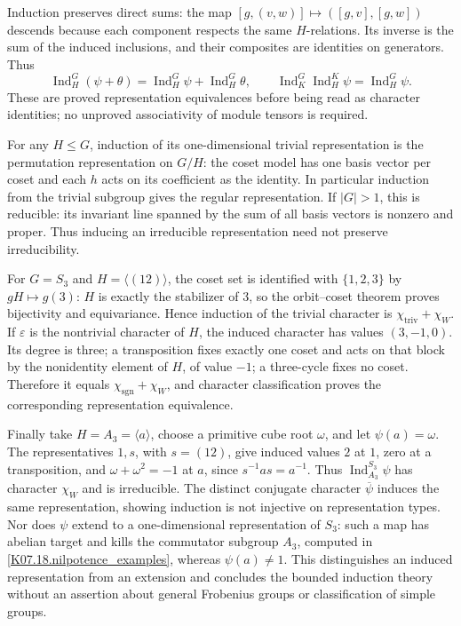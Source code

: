 Induction preserves direct sums: the map
$[g,(v,w)]\mapsto([g,v],[g,w])$ descends because each component
respects the same $H$-relations. Its inverse is the sum of the induced
inclusions, and their composites are identities on generators. Thus
\[
 \operatorname{Ind}_H^G(\psi+\theta)
 =\operatorname{Ind}_H^G\psi+\operatorname{Ind}_H^G\theta,
 \qquad
 \operatorname{Ind}_K^G\operatorname{Ind}_H^K\psi
 =\operatorname{Ind}_H^G\psi.
\]
These are proved representation equivalences before being read as
character identities; no unproved associativity of module tensors is
required.

For any $H\leq G$, induction of its one-dimensional trivial
representation is the permutation representation on $G/H$: the coset
model has one basis vector per coset and each $h$ acts on its coefficient
as the identity. In particular induction from the trivial subgroup gives
the regular representation. If $|G|>1$, this is reducible: its invariant
line spanned by the sum of all basis vectors is nonzero and proper.
Thus inducing an irreducible representation need not preserve
irreducibility.

For $G=S_3$ and $H=\langle(12)\rangle$, the coset set is identified
with $\{1,2,3\}$ by $gH\mapsto g(3)$: $H$ is exactly the
stabilizer of $3$, so the orbit--coset theorem proves bijectivity and
equivariance. Hence induction of the trivial character is
$\chi_{\mathrm{triv}}+\chi_W$. If $\varepsilon$ is the nontrivial
character of $H$, the induced character has values $(3,-1,0)$.
Its degree is three; a transposition fixes exactly one coset and acts
on that block by the nonidentity element of $H$, of value $-1$;
a three-cycle fixes no coset. Therefore it equals
$\chi_{\mathrm{sgn}}+\chi_W$, and character classification proves
the corresponding representation equivalence.

Finally take $H=A_3=\langle a\rangle$, choose a primitive cube root
$\omega$, and let $\psi(a)=\omega$. The representatives $1,s$,
with $s=(12)$, give induced values $2$ at $1$, zero at a
transposition, and $\omega+\omega^2=-1$ at $a$, since
$s^{-1}as=a^{-1}$. Thus $\operatorname{Ind}_{A_3}^{S_3}\psi$
has character $\chi_W$ and is irreducible. The distinct conjugate
character $\overline\psi$ induces the same representation, showing
induction is not injective on representation types. Nor does $\psi$
extend to a one-dimensional representation of $S_3$: such a map has
abelian target and kills the commutator subgroup $A_3$, computed in
\ref{K07.18.nilpotence_examples}, whereas $\psi(a)\ne1$.
This distinguishes an induced representation from an extension and
concludes the bounded induction theory without an assertion about
general Frobenius groups or classification of simple groups.
